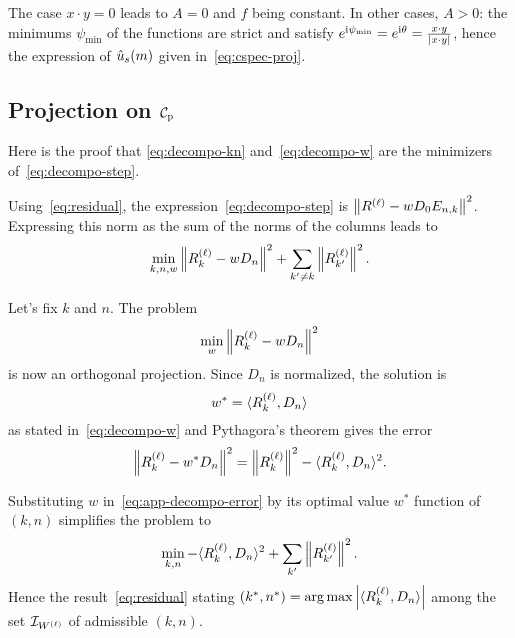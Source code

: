 The case $x\cdot y=0$ leads to $A=0$ and $f$ being constant.
In other cases, $A>0$: the minimums $\psi_\mathrm{min}$ of the functions are strict and satisfy $e^{\mathrm{i}\psi_\mathrm{min}}=e^{\mathrm{i}\theta}=\frac{x\cdot y}{{\left|x\cdot y\right|}}$, hence the expression of $\hat{u}_s(m)$ given in~\eqref{eq:cspec-proj}.


\subsection{Projection on \texorpdfstring{${\mathcal{C}_{\mathrm{p}}}$}{the Patch Constraint}}
\label{app:patch-proj}

Here is the proof that \eqref{eq:decompo-kn} and~\eqref{eq:decompo-w} are the minimizers of~\eqref{eq:decompo-step}.

Using~\eqref{eq:residual}, the expression~\eqref{eq:decompo-step} is $\left\|R^{\left(\ell\right)} - w D_0 E_{n,k}\right\|^2$.
Expressing this norm as the sum of the norms of the columns leads to
\begin{equation}
  \label{eq:app-decompo-error}
  \min_{k,n,w} \left\|R^{\left(\ell\right)}_k - w D_n\right\|^2 + \sum_{k'\neq k} \left\|R^{\left(\ell\right)}_{k'}\right\|^2.
\end{equation}

Let's fix $k$ and $n$.
The problem
\begin{equation}
  \min_w \left\|R^{\left(\ell\right)}_k-wD_n\right\|^2
\end{equation}
is now an orthogonal projection.
Since $D_n$ is normalized, the solution is
\begin{equation}
  w^* = \langle R^{\left(\ell\right)}_k,D_n \rangle
\end{equation}
as stated in~\eqref{eq:decompo-w} and Pythagora's theorem gives the error
\begin{equation}
  \left\|R^{\left(\ell\right)}_k - w^* D_n\right\|^2 = \left\|R^{\left(\ell\right)}_k\right\|^2 - \langle R^{\left(\ell\right)}_k,D_n \rangle^2.
\end{equation}

Substituting $w$ in~\eqref{eq:app-decompo-error} by its optimal value $w^*$ function of $(k,n)$ simplifies the problem to
\begin{equation}
  \min_{k,n} - \langle R^{\left(\ell\right)}_k,D_n \rangle^2 + \sum_{k'} \left\|R^{\left(\ell\right)}_{k'}\right\|^2.
\end{equation}
Hence the result~\eqref{eq:residual} stating $(k^*,n^*) = \operatorname*{arg\,max} {\left|\langle R^{\left(\ell\right)}_k,D_n \rangle\right|}$ among the set $\mathcal{I}_{W^{\left(\ell\right)}}$ of admissible $(k,n)$.